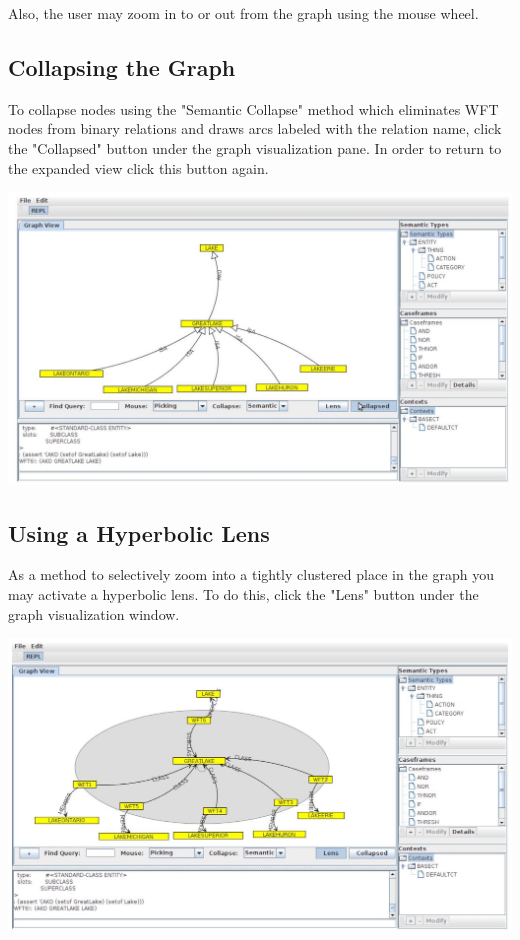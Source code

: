 \documentclass[10pt]{article}
\begin{document}
Also, the user may zoom in to or out from the graph using the mouse wheel.

\subsection{Collapsing the Graph}
To collapse nodes using the "Semantic Collapse" method which eliminates WFT nodes from binary relations and draws arcs labeled with the relation name, click the "Collapsed" button under the graph visualization pane. In order to return to the expanded view click this button again.

\begin{center}
\includegraphics[max width=\textwidth]{2023_06_06_402e2c8ca4c84733095bg-6}
\end{center}

\subsection{Using a Hyperbolic Lens}
As a method to selectively zoom into a tightly clustered place in the graph you may activate a hyperbolic lens. To do this, click the "Lens" button under the graph visualization window.

\begin{center}
\includegraphics[max width=\textwidth]{2023_06_06_402e2c8ca4c84733095bg-7(1)}
\end{center}
\end{document}

